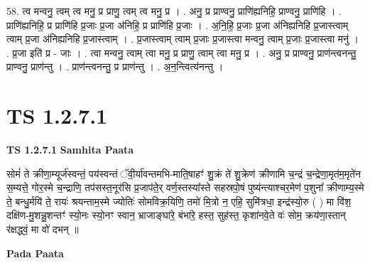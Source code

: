\documentclass[17pt]{extarticle}
\begin{document}
58. त्व मन्वनु॒ त्वम् त्व मनु॒ प्र प्राणु॒ त्वम् त्व मनु॒ प्र । . अनु॒ प्र प्राण्वनु॒ प्राणि॑ह्यनिहि॒ प्राण्वनु॒ प्राणि॑हि । . प्राणि॑ह्यनिहि॒ प्र प्राणि॑हि प्र॒जाः प्र॒जा अ॑निहि॒ प्र प्राणि॑हि प्र॒जाः । . अ॒नि॒हि॒ प्र॒जाः प्र॒जा अ॑निह्यनिहि प्र॒जास्त्वाम् त्वाम् प्र॒जा अ॑निह्यनिहि प्र॒जास्त्वाम् । . प्र॒जास्त्वाम् त्वाम् प्र॒जाः प्र॒जास्त्वा मन्वनु॒ त्वाम् प्र॒जाः प्र॒जास्त्वा मनु॑ । . प्र॒जा इति॑ प्र - जाः । . त्वा मन्वनु॒ त्वाम् त्वा मनु॒ प्र प्राणु॒ त्वाम् त्वा मनु॒ प्र । . अनु॒ प्र प्राण्वनु॒ प्राण॑न्त्वनन्तु॒ प्राण्वनु॒ प्राण॑न्तु । . प्राण॑न्त्वनन्तु॒ प्र प्राण॑न्तु । . अ॒न॒न्त्वित्य॑नन्तु । \newline
\pagebreak
{}
\section*{ TS 1.2.7.1 }

\textbf{TS 1.2.7.1 } \newline
\textbf{Samhita Paata} \newline

सोमं॑ ते क्रीणा॒म्यूर्ज॑स्वन्तं॒ पय॑स्वन्तं ॅवी॒र्या॑वन्तमभि-माति॒षाहꣳ॑ शु॒क्रं ते॑ शु॒क्रेण॑ क्रीणामि च॒न्द्रं च॒न्द्रेणा॒मृत॑म॒मृते॑न स॒म्यत्ते॒ गोर॒स्मे च॒न्द्राणि॒ तप॑सस्त॒नूर॑सि प्र॒जाप॑ते॒र् वर्ण॒स्तस्या᳚स्ते सहस्रपो॒षं पुष्य॑न्त्याश्चर॒मेण॑ प॒शुना᳚ क्रीणाम्य॒स्मे ते॒ बन्धु॒र्मयि॑ ते॒ रायः॑ श्रयन्ताम॒स्मे ज्योतिः॑ सोमविक्र॒यिणि॒ तमो॑ मि॒त्रो न॒ एहि॒ सुमि॑त्रधा॒ इन्द्र॑स्यो॒रु ( ) मा वि॑श॒ दक्षि॑ण-मु॒शन्नु॒शन्तꣳ॑ स्यो॒नः स्यो॒नꣳ स्वान॒ भ्राजाङ्घा॑रे॒ बंभा॑रे॒ हस्त॒ सुह॑स्त॒ कृशा॑नवे॒ते वः॑ सोम॒ क्रय॑णा॒स्तान् र॑क्षद्ध्वं॒ मा वो॑ दभन् ॥ \newline

\textbf{Pada Paata} \newline
\end{document}
